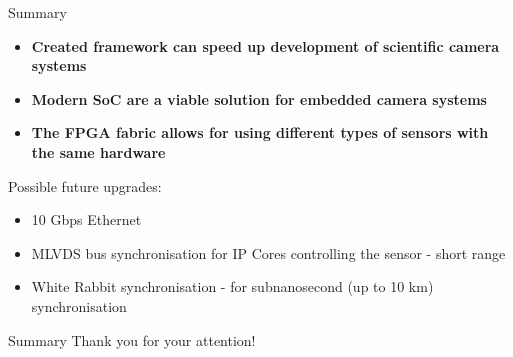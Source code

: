 \documentclass[10pt]{beamer}
\begin{document}
    \begin{frame}{Summary}

        \begin{itemize}

            \item \textbf{Created framework can speed up development of scientific camera systems}

            \item \textbf{Modern SoC are a viable solution for embedded camera systems}

            \item \textbf{The FPGA fabric allows for using different types of sensors with the same hardware}

        \end{itemize}
        \vspace{1cm}
        Possible future upgrades:
        \begin{itemize}

            \item  10 Gbps Ethernet 
            \item  MLVDS bus synchronisation for IP Cores controlling the sensor - short range
            \item  White Rabbit synchronisation - for subnanosecond (up to 10 km) synchronisation 
        \end{itemize}

    \end{frame}


    \begin{frame}{Summary}
        \centering
        \LARGE{Thank you for your attention!}

    \end{frame}
\end{document}
